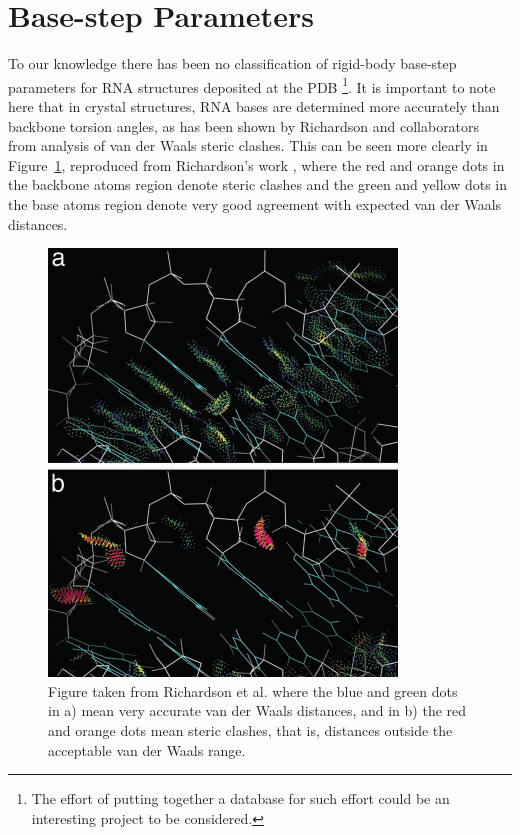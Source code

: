 \section{Base-step Parameters}

To our  knowledge there has  been no classification of rigid-body
base-step  parameters for RNA structures deposited at  the
PDB \footnote{The effort of putting together a database for such effort
could be an  interesting project to be considered.}.   It is important
to note here that in  crystal structures, RNA bases are determined more
accurately  than  backbone  torsion  angles,  as  has  been  shown  by
Richardson  and collaborators from  analysis of  van der  Waals steric
clashes.   This can  be seen  more clearly  in Figure~\ref{fig:murray},
reproduced from Richardson's work \cite{murray2003}, where the red
and orange dots  in the backbone atoms region  denote steric clashes and
the green  and yellow  dots in  the base atoms  region denote  very good
agreement with expected van der Waals distances.

\begin{figure}[htbp]
 \centering
 \includegraphics[scale=0.5]{Chapter2/murray2003.png}
 \caption{Figure taken from  Richardson et al. \cite{murray2003} where
 the  blue and  green dots  in  a) mean  very accurate  van der  Waals
 distances, and  in b)  the red and  orange dots mean  steric clashes,
 that is, distances outside the acceptable van der Waals range.}
 \label{fig:murray}
\end{figure}

